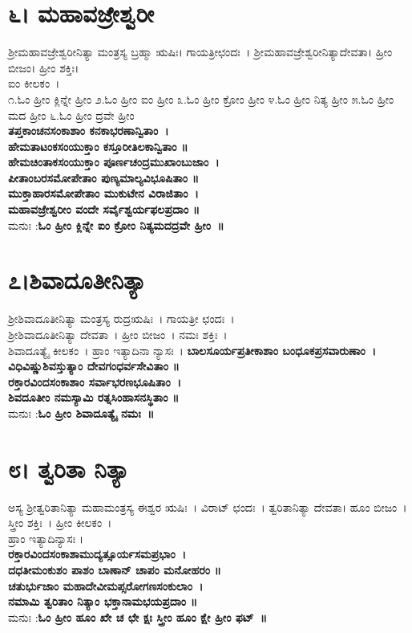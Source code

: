 \section{೬। ಮಹಾವಜ್ರೇಶ್ವರೀ}
ಶ್ರೀಮಹಾವಜ್ರೇಶ್ವರೀನಿತ್ಯಾ ಮಂತ್ರಸ್ಯ ಬ್ರಹ್ಮಾ ಋಷಿಃ। ಗಾಯತ್ರೀಛಂದಃ~। ಶ್ರೀಮಹಾವಜ್ರೇಶ್ವರೀನಿತ್ಯಾದೇವತಾ। ಹ್ರೀಂ ಬೀಜಂ। ಹ್ರೀಂ ಶಕ್ತಿಃ।\\
ಐಂ ಕೀಲಕಂ~।\\
೧.ಓಂ ಹ್ರೀಂ ಕ್ಲಿನ್ನೇ ಹ್ರೀಂ  ೨.ಓಂ ಹ್ರೀಂ ಐಂ ಹ್ರೀಂ  ೩.ಓಂ ಹ್ರೀಂ ಕ್ರೋಂ ಹ್ರೀಂ ೪.ಓಂ ಹ್ರೀಂ ನಿತ್ಯ ಹ್ರೀಂ  ೫.ಓಂ ಹ್ರೀಂ ಮದ ಹ್ರೀಂ ೬.ಓಂ ಹ್ರೀಂ ದ್ರವೇ ಹ್ರೀಂ \\
{\bfseries ತಪ್ತಕಾಂಚನಸಂಕಾಶಾಂ ಕನಕಾಭರಣಾನ್ವಿತಾಂ~।\\
ಹೇಮತಾಟಂಕಸಂಯುಕ್ತಾಂ ಕಸ್ತೂರೀತಿಲಕಾನ್ವಿತಾಂ ॥\\
ಹೇಮಚಿಂತಾಕಸಂಯುಕ್ತಾಂ ಪೂರ್ಣಚಂದ್ರಮುಖಾಂಬುಜಾಂ~।\\
ಪೀತಾಂಬರಸಮೋಪೇತಾಂ ಪುಣ್ಯಮಾಲ್ಯವಿಭೂಷಿತಾಂ ॥\\
ಮುಕ್ತಾಹಾರಸಮೋಪೇತಾಂ ಮುಕುಟೇನ ವಿರಾಜಿತಾಂ~।\\
ಮಹಾವಜ್ರೇಶ್ವರೀಂ ವಂದೇ ಸರ್ವೈಶ್ವರ್ಯಫಲಪ್ರದಾಂ ॥\\}
ಮನುಃ :{\bfseries  ಓಂ ಹ್ರೀಂ ಕ್ಲಿನ್ನೇ ಐಂ ಕ್ರೋಂ ನಿತ್ಯಮದದ್ರವೇ ಹ್ರೀಂ~॥}
\section{೭।ಶಿವಾದೂತೀನಿತ್ಯಾ}
ಶ್ರೀಶಿವಾದೂತೀನಿತ್ಯಾ ಮಂತ್ರಸ್ಯ ರುದ್ರಋಷಿಃ~। ಗಾಯತ್ರೀ ಛಂದಃ~।\\ ಶ್ರೀಶಿವಾದೂತೀನಿತ್ಯಾ ದೇವತಾ~। ಹ್ರೀಂ ಬೀಜಂ~। ನಮಃ ಶಕ್ತಿಃ~।\\ ಶಿವಾದೂತ್ಯೈ ಕೀಲಕಂ~। ಹ್ರಾಂ ಇತ್ಯಾದಿನಾ ನ್ಯಾಸಃ~।
{\bfseries ಬಾಲಸೂರ್ಯಪ್ರತೀಕಾಶಾಂ ಬಂಧೂಕಪ್ರಸವಾರುಣಾಂ~।\\
ವಿಧಿವಿಷ್ಣುಶಿವಸ್ತುತ್ಯಾಂ ದೇವಗಂಧರ್ವಸೇವಿತಾಂ ॥\\
ರಕ್ತಾರವಿಂದಸಂಕಾಶಾಂ ಸರ್ವಾಭರಣಭೂಷಿತಾಂ~।\\
ಶಿವದೂತೀಂ ನಮಸ್ಯಾಮಿ ರತ್ನಸಿಂಹಾಸನಸ್ಥಿತಾಂ ॥\\}
ಮನುಃ :{\bfseries  ಓಂ ಹ್ರೀಂ ಶಿವಾದೂತ್ಯೈ ನಮಃ~॥}
\section{೮। ತ್ವರಿತಾ ನಿತ್ಯಾ}
ಅಸ್ಯ ಶ್ರೀತ್ವರಿತಾನಿತ್ಯಾ ಮಹಾಮಂತ್ರಸ್ಯ ಈಶ್ವರ ಋಷಿಃ~। ವಿರಾಟ್ ಛಂದಃ~। ತ್ವರಿತಾನಿತ್ಯಾ ದೇವತಾ। ಹೂಂ ಬೀಜಂ~। ಸ್ತ್ರೀಂ ಶಕ್ತಿಃ~। ಹ್ರೀಂ ಕೀಲಕಂ~।\\
ಹ್ರಾಂ ಇತ್ಯಾದಿನ್ಯಾಸಃ ।\\
{\bfseries ರಕ್ತಾರವಿಂದಸಂಕಾಶಾಮುದ್ಯತ್ಸೂರ್ಯಸಮಪ್ರಭಾಂ~।\\
ದಧತೀಮಂಕುಶಂ ಪಾಶಂ ಬಾಣಾನ್ ಚಾಪಂ ಮನೋಹರಂ ॥\\
ಚತುರ್ಭುಜಾಂ ಮಹಾದೇವೀಮಪ್ಸರೋಗಣಸಂಕುಲಾಂ~।\\
ನಮಾಮಿ ತ್ವರಿತಾಂ ನಿತ್ಯಾಂ ಭಕ್ತಾನಾಮಭಯಪ್ರದಾಂ ॥\\}
ಮನುಃ :{\bfseries  ಓಂ ಹ್ರೀಂ ಹೂಂ ಖೇ ಚ ಛೇ ಕ್ಷಃ ಸ್ತ್ರೀಂ ಹೂಂ ಕ್ಷೇ ಹ್ರೀಂ ಫಟ್~॥}
